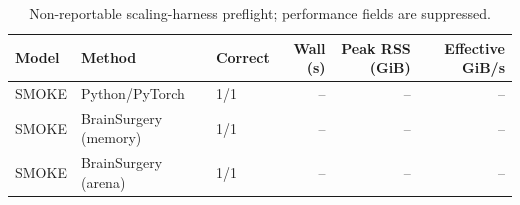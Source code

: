 \begin{table}[t]
\centering
\small
\begin{tabular}{lllrrr}
\toprule
Model & Method & Correct & Wall (s) & Peak RSS (GiB) & Effective GiB/s \\
\midrule
SMOKE & Python/PyTorch & 1/1 & -- & -- & -- \\
SMOKE & BrainSurgery (memory) & 1/1 & -- & -- & -- \\
SMOKE & BrainSurgery (arena) & 1/1 & -- & -- & -- \\
\bottomrule
\end{tabular}
\caption{Non-reportable scaling-harness preflight; performance fields are suppressed.}
\label{tab:checkpoint-scaling}
\end{table}
